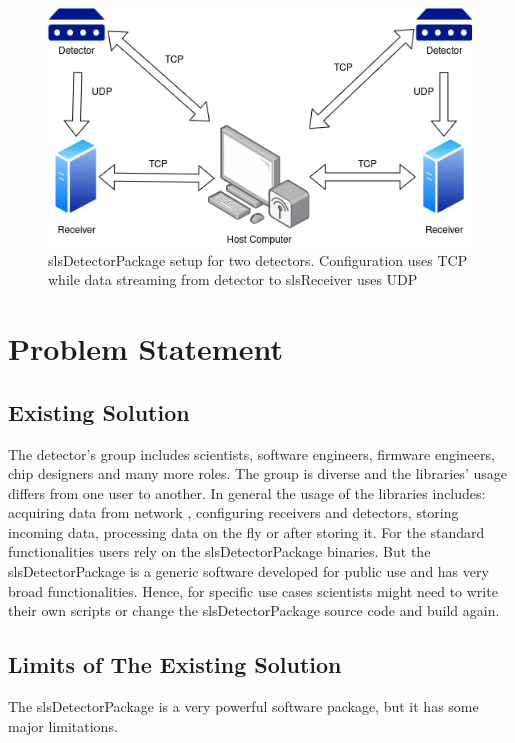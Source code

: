 \begin{spacing}{1.2}
    \begin{figure}[h]
        \centering
        \includegraphics[scale=0.8]{Chapitre1/figures/slsreceiver.png}
        \caption{slsDetectorPackage setup for two detectors. Configuration uses TCP while
            data streaming from detector to slsReceiver uses UDP}
        \label{fig:detector}
    \end{figure}

    \section{Problem Statement}
    \subsection{Existing Solution}
    The detector's group includes scientists, software engineers, firmware engineers, chip designers and many more roles.
    The group is diverse and the libraries' usage differs from one user to another. In general the usage of the libraries includes: acquiring data from network
    , configuring receivers and detectors, storing incoming data, processing data on the fly or after storing it.
    For the standard functionalities users rely on the slsDetectorPackage binaries. But the slsDetectorPackage is a generic software
    developed for public use and has very broad functionalities. Hence, for specific use cases scientists might need to write their own scripts
    or change the slsDetectorPackage source code and build again.
    \subsection{Limits of The Existing Solution}
    The slsDetectorPackage is a very powerful software package, but it has some major limitations.

\end{spacing}
